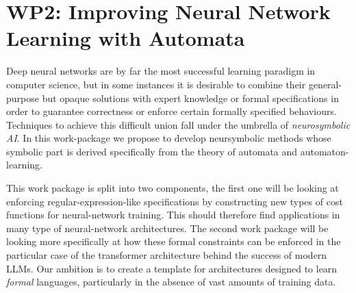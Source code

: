 \documentclass[11pt,a4paper]{article}
\begin{document}
		
	\section*{WP2: Improving Neural Network Learning with Automata}
	Deep neural networks are by far the most successful learning paradigm in computer science, but in some instances it is desirable to combine their general-purpose but opaque solutions with expert knowledge or formal specifications in order to guarantee correctness or enforce certain formally specified behaviours. Techniques to achieve this difficult union fall under the umbrella of \emph{neurosymbolic AI}. In this work-package we propose to develop neursymbolic methods whose symbolic part is derived specifically from the theory of automata and automaton-learning.
	
	This work package is split into two components, the first one will be looking at enforcing regular-expression-like specifications by constructing new types of cost functions for neural-network training. This should therefore find applications in many type of neural-network architectures. The second work package will be looking more specifically at how these formal constraints can be enforced in the particular case of the transformer architecture behind the success of modern LLMs. Our ambition is to create a template for architectures designed to learn \emph{formal} languages, particularly in the absence of vast amounts of training data.
	
	\setcounter{section}{2}
	\setcounter{subsection}{0}
\end{document}
